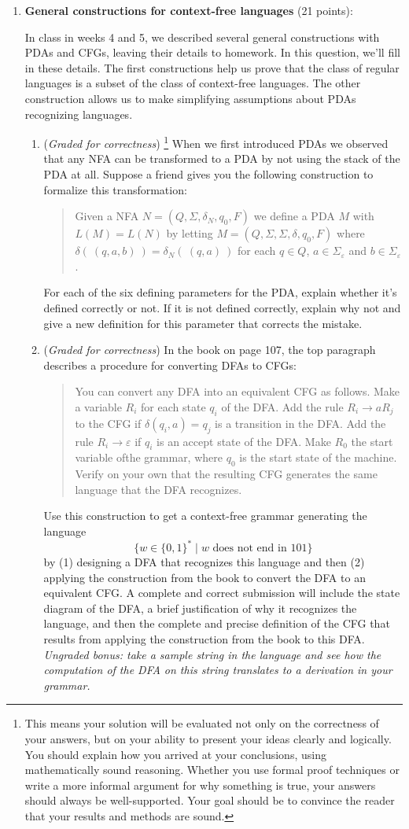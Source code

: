\documentclass[12pt, oneside]{article}
\newcommand{\gradeCorrect}{({\it Graded for correctness}) }
\newcommand{\gradeCorrectFirst}{\gradeCorrect\footnote{This means your solution 
will be evaluated not only on the correctness of your answers, but on your ability
to present your ideas clearly and logically. You should explain how you 
arrived at your conclusions, using
mathematically sound reasoning. Whether you use formal proof techniques or 
write a more informal argument
for why something is true, your answers should always be well-supported. 
Your goal should be to convince the
reader that your results and methods are sound.} }
\begin{document}
\begin{enumerate}[wide, labelwidth=!, labelindent=0pt]
\item \textbf{General constructions for context-free languages} (21 points):

In class in weeks 4 and 5, we described several general constructions 
with PDAs and CFGs, leaving their details to
homework. In this question, we'll fill in these details. The first constructions
help us prove that the class of regular languages is a subset of the
class of context-free languages. The other construction allows us 
to make simplifying assumptions about PDAs recognizing languages.

\begin{enumerate}

\item\gradeCorrectFirst When we first introduced PDAs we observed 
that any NFA can be transformed to a PDA by not using the stack 
of the PDA at all. Suppose a friend gives you the following construction
to formalize this transformation:

\begin{quote}
Given a NFA $N = (Q, \Sigma, \delta_N, q_0, F)$ we define a PDA $M$
with $L(M) = L(N)$ by letting $M = ( Q, \Sigma, \Sigma, \delta, q_0, F)$ where 
$\delta(~(q,a,b)~) = \delta_N(~(q,a)~)$ for each $q \in Q$, 
$a \in \Sigma_{\varepsilon}$ and $b \in \Sigma_{\varepsilon}$.
\end{quote}

For each of the six defining parameters for the PDA, explain whether 
it's defined correctly or not. If it is not defined correctly, 
explain why not and give a new definition for this parameter that 
corrects the mistake.

\item\gradeCorrect In the book on page 107, the top paragraph describes a procedure for converting DFAs to CFGs:
\begin{quote}
   You can convert any DFA into an equivalent CFG as follows. 
   Make a variable $R_i$ for each state $q_i$ of the DFA. Add the rule $R_i \to aR_j$ to the
   CFG if $\delta(q_i,a) =q_j$ is a transition in the DFA. Add the rule
   $R_i\to \varepsilon$ if $q_i$ is an accept state of the DFA. Make $R_0$ the start variable ofthe grammar, 
   where $q_0$ is the start state of the machine. Verify on your own that the resulting CFG 
   generates the same language that the DFA recognizes.
\end{quote}

Use this construction to get a context-free grammar generating the language 
\[
    \{ w \in \{0,1\}^* \mid w \text{ does not end in  $101$}\}
\]
by (1) designing a DFA that recognizes this language and then (2) applying the construction from the book to convert the 
DFA to an equivalent CFG. A complete and correct submission will include the state diagram of the DFA, a brief justification of why 
it recognizes the language, and then the complete and precise definition of the CFG that results from applying the construction 
from the book to this DFA. {\it Ungraded bonus: take a sample string in the language and see how the computation of 
the DFA on this string translates to a derivation in your grammar.}


\end{enumerate}
\end{enumerate}
\end{document}
